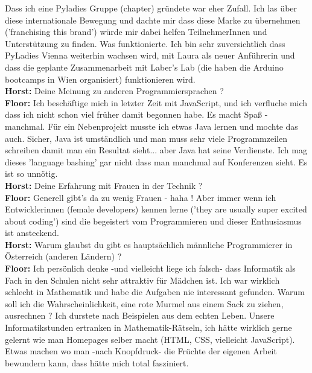 \documentclass[10pt,a4paper,ngerman,twoside]{article} %
\begin{document}
Dass ich eine Pyladies Gruppe (chapter) gründete war eher Zufall. Ich las über diese internationale Bewegung und dachte mir dass diese Marke zu übernehmen ('franchising this brand') würde mir dabei helfen TeilnehmerInnen und Unterstützung zu finden. Was funktionierte.
Ich bin sehr zuversichtlich dass PyLadies Vienna weiterhin wachsen wird, mit Laura als neuer Anführerin und dass die geplante Zusammenarbeit mit Laber's Lab (die haben die Arduino bootcamps in Wien organisiert) funktionieren wird. \\
\textbf{Horst:} Deine Meinung zu anderen Programmiersprachen ? \\
\textbf{Floor:} Ich beschäftige mich in letzter Zeit mit JavaScript, und ich verfluche mich dass ich nicht schon viel früher damit begonnen habe. Es macht Spaß - manchmal. Für ein Nebenprojekt musste ich etwas Java lernen und mochte das auch. Sicher, Java ist umständlich und man muss sehr viele Programmzeilen schreiben damit man ein Resultat sieht... aber Java hat seine Verdienste. Ich mag dieses 'language bashing' gar nicht dass man manchmal auf Konferenzen sieht. Es ist so unnötig. \\
\textbf{Horst:} Deine Erfahrung mit Frauen in der Technik ? \\
\textbf{Floor:} Generell gibt's da zu wenig Frauen - haha ! Aber immer wenn ich Entwicklerinnen (female developers) kennen lerne ('they are usually super excited about coding') sind die begeistert vom Programmieren und dieser Enthusiasmus ist ansteckend. \\
\textbf{Horst:} Warum glaubst du gibt es hauptsächlich männliche Programmierer in Österreich (anderen Ländern) ? \\
\textbf{Floor:} Ich persönlich denke -und vielleicht liege ich falsch- dass Informatik als Fach in den Schulen nicht sehr attraktiv für Mädchen ist. Ich war wirklich schlecht in Mathematik und habe die Aufgaben nie interessant gefunden. Warum soll ich die Wahrscheinlichkeit, eine rote Murmel aus einem Sack zu ziehen, ausrechnen ? Ich durstete nach Beispielen aus dem echten Leben. Unsere Informatikstunden ertranken in Mathematik-Rätseln, ich hätte wirklich gerne gelernt wie man Homepages selber macht (HTML, CSS, vielleicht JavaScript). Etwas machen wo man -nach Knopfdruck- die Früchte der eigenen Arbeit bewundern kann, dass hätte mich total fasziniert. 
\end{document}
